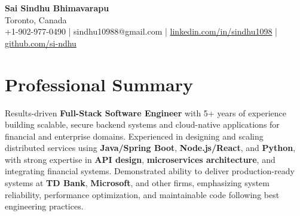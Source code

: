 \documentclass[letterpaper,11pt]{article}
\begin{document}
\begin{center}
  {\Large \textbf{Sai Sindhu Bhimavarapu}} \\
  Toronto, Canada \\
  +1-902-977-0490 \enspace | \enspace sindhu10988@gmail.com \enspace | \enspace \href{https://www.linkedin.com/in/sindhu1098/}{linkedin.com/in/sindhu1098} \enspace | \enspace \href{https://github.com/si-ndhu}{github.com/si-ndhu}
\end{center}

\section{Professional Summary}
  \begin{itemize}[leftmargin=0.15in, label={}]
    \small{\item{
     Results-driven \textbf{Full-Stack Software Engineer} with 5+ years of experience building scalable, secure backend systems and cloud-native applications for financial and enterprise domains. Experienced in designing and scaling distributed services using \textbf{Java/Spring Boot}, \textbf{Node.js/React}, and \textbf{Python}, with strong expertise in \textbf{API design}, \textbf{microservices architecture}, and integrating financial systems. Demonstrated ability to deliver production-ready systems at \textbf{TD Bank}, \textbf{Microsoft}, and other firms, emphasizing system reliability, performance optimization, and maintainable code following best engineering practices.
    }}
  \end{itemize}
\vspace{-16pt}

\end{document}

